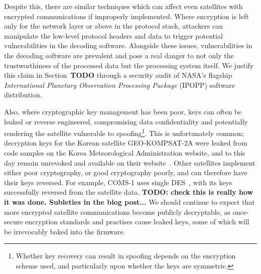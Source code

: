 

Despite this, there are similar techniques which can affect even satellites with encrypted communications if improperly implemented.
Where encryption is left only for the network layer or above in the protocol stack, attackers can manipulate the low-level protocol headers and data to trigger potential vulnerabilities in the decoding software.
Alongside these issues, vulnerabilities in the decoding software are prevalent and pose a real danger to not only the trustworthiness of the processed data but the processing system itself.
We justify this claim in Section~\textbf{TODO} through a security audit of NASA's flagship \textit{International Planetary Observation Processing Package} (IPOPP) software distribution.

Also, where cryptographic key management has been poor, keys can often be leaked or reverse engineered, compromising data confidentiality and potentially rendering the satellite vulnerable to spoofing\footnote{Whether key recovery can result in spoofing depends on the encryption scheme used, and particularly upon whether the keys are symmetric.}.
This is unfortunately common; decryption keys for the Korean satellite GEO-KOMPSAT-2A were leaked from code samples on the Korea Meteorological Administration website, and to this day remain unrevoked and available on their website~\cite{xrit-rx}.
Other satellites implement either poor cryptography, or good cryptography poorly, and can therefore have their keys reversed.
For example, COMS-1 uses single DES~\cite{lrit-key-dec}, with its keys successfully reversed from the satellite data. \textbf{TODO: check this is really how it was done. Subleties in the blog post...}
We should continue to expect that more encrypted satellite communications become publicly decryptable, as once-secure encryption standards and practises cause leaked keys, some of which will be irrevocably baked into the firmware.

